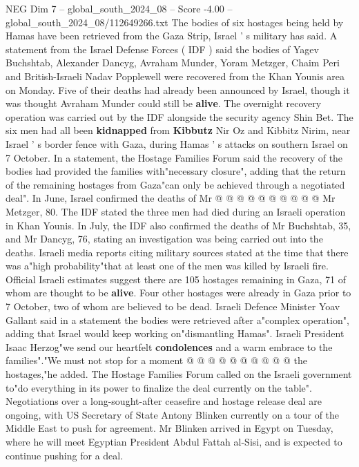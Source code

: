 \begin{textsample}{NEG Dim 7 – global\_south\_2024\_08 – Score -4.00 – global\_south\_2024\_08/112649266.txt}  \label{ex:f7_neg_377}
The bodies of six hostages being held by Hamas have been retrieved from the Gaza Strip, Israel ' s military has said.
A statement from the Israel Defense Forces ( IDF ) said the bodies of Yagev Buchshtab, Alexander Dancyg, Avraham Munder, Yoram Metzger, Chaim Peri and British-Israeli Nadav Popplewell were recovered from the Khan Younis area on Monday.
Five of their deaths had already been announced by Israel, though it was thought Avraham Munder could still be \textbf{alive}.
The overnight recovery operation was carried out by the IDF alongside the security agency Shin Bet.
The six men had all been \textbf{kidnapped} from \textbf{Kibbutz} Nir Oz and Kibbitz Nirim, near Israel ' s border fence with Gaza, during Hamas ' s attacks on southern Israel on 7 October.
In a statement, the Hostage Families Forum said the recovery of the bodies had provided the families with"necessary closure", adding that the return of the remaining hostages from Gaza"can only be achieved through a negotiated deal".
In June, Israel confirmed the deaths of Mr @ @ @ @ @ @ @ @ @ @ Mr Metzger, 80.
The IDF stated the three men had died during an Israeli operation in Khan Younis.
In July, the IDF also confirmed the deaths of Mr Buchshtab, 35, and Mr Dancyg, 76, stating an investigation was being carried out into the deaths.
Israeli media reports citing military sources stated at the time that there was a"high probability"that at least one of the men was killed by Israeli fire.
Official Israeli estimates suggest there are 105 hostages remaining in Gaza, 71 of whom are thought to be \textbf{alive}.
Four other hostages were already in Gaza prior to 7 October, two of whom are believed to be dead.
Israeli Defence Minister Yoav Gallant said in a statement the bodies were retrieved after a"complex operation", adding that Israel would keep working on"dismantling Hamas".
Israeli President Isaac Herzog"we send our heartfelt \textbf{condolences} and a warm embrace to the families"."We must not stop for a moment @ @ @ @ @ @ @ @ @ @ the hostages,"he added.
The Hostage Families Forum called on the Israeli government to"do everything in its power to finalize the deal currently on the table".
Negotiations over a long-sought-after ceasefire and hostage release deal are ongoing, with US Secretary of State Antony Blinken currently on a tour of the Middle East to push for agreement.
Mr Blinken arrived in Egypt on Tuesday, where he will meet Egyptian President Abdul Fattah al-Sisi, and is expected to continue pushing for a deal.

\end{textsample}
